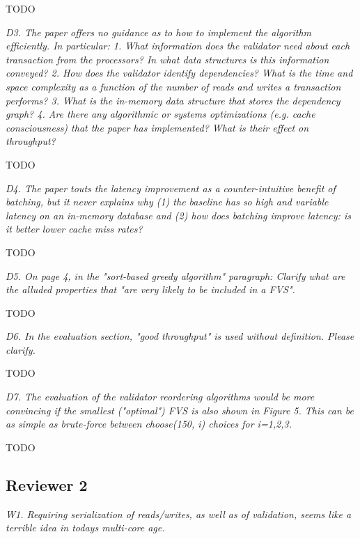 \documentclass{article}
\begin{document}
\bigskip
TODO

\bigskip

\emph{D3. The paper offers no guidance as to how to implement the algorithm efficiently. In particular:
	1. What information does the validator need about each transaction from the processors? In what data structures is this information conveyed?
	2. How does the validator identify dependencies? What is the time and space complexity as a function of the number of reads and writes a transaction performs?
	3. What is the in-memory data structure that stores the dependency graph? 
	4. Are there any algorithmic or systems optimizations (e.g. cache consciousness) that the paper has implemented? What is their effect on throughput?}


\bigskip

TODO

\bigskip

\emph{D4. The paper touts the latency improvement as a counter-intuitive benefit of batching, but it never explains why (1) the baseline has so high and variable latency on an in-memory database and (2) how does batching improve latency: is it better lower cache miss rates?}

\bigskip

TODO

\bigskip

\emph{D5. On page 4, in the "sort-based greedy algorithm" paragraph: Clarify what are the alluded properties that "are very likely to be included in a FVS".}

\bigskip

TODO

\bigskip
\emph{D6. In the evaluation section, "good throughput" is used without definition. Please clarify.}

\bigskip

TODO

\bigskip
\emph{D7. The evaluation of the validator reordering algorithms would be more convincing if the smallest ("optimal") FVS is also shown in Figure 5. This can be as simple as brute-force between choose(150, i) choices for i=1,2,3.}

\bigskip

TODO

\bigskip

\subsection{Reviewer 2}

\emph{W1. Requiring serialization of reads/writes, as well as of validation, seems like a terrible idea in todays multi-core age. }
\end{document}
